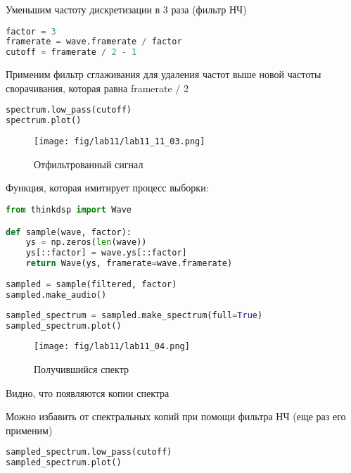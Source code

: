 Уменьшим частоту дискретизации в 3 раза (фильтр НЧ)

\begin{lstlisting}[language=Python]
factor = 3
framerate = wave.framerate / factor
cutoff = framerate / 2 - 1
\end{lstlisting}

Применим фильтр сглаживания для удаления частот выше новой частоты сворачивания, которая равна framerate / 2

\begin{lstlisting}[language=Python]
spectrum.low_pass(cutoff)
spectrum.plot()
\end{lstlisting}

\begin{figure}[H]
	\begin{center}
		\texttt{[image: fig/lab11/lab11\_11\_03.png]}
		\caption{Отфильтрованный сигнал}
	\end{center}
\end{figure}

Функция, которая имитирует процесс выборки:

\begin{lstlisting}[language=Python]
from thinkdsp import Wave

def sample(wave, factor):
    ys = np.zeros(len(wave))
    ys[::factor] = wave.ys[::factor]
    return Wave(ys, framerate=wave.framerate) 
    
sampled = sample(filtered, factor)
sampled.make_audio()
\end{lstlisting}

\begin{lstlisting}[language=Python]
sampled_spectrum = sampled.make_spectrum(full=True)
sampled_spectrum.plot()
\end{lstlisting}

\begin{figure}[H]
	\begin{center}
		\texttt{[image: fig/lab11/lab11\_04.png]}
		\caption{Получившийся спектр}
	\end{center}
\end{figure}

Видно, что появляются копии спектра

Можно избавить от спектральных копий при помощи фильтра НЧ (еще раз его применим)

\begin{lstlisting}[language=Python]
sampled_spectrum.low_pass(cutoff)
sampled_spectrum.plot()
\end{lstlisting}

